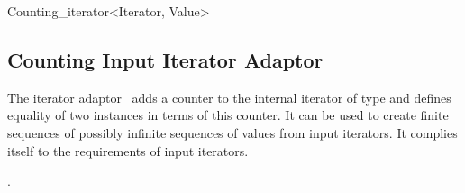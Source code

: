 \begin{ccClassTemplate}{Counting_iterator<Iterator, Value>}
\subsection{Counting Input Iterator Adaptor}
\label{sectionCountingIterator}

\ccDefinition

The iterator adaptor \ccClassTemplateName\ adds a counter to the
internal iterator of type  and defines equality of two
instances in terms of this counter. It can be used to create finite
sequences of possibly infinite sequences of values from input
iterators. It complies itself to the requirements of input iterators.


\ccCreation




\ccSeeAlso

.
\end{ccClassTemplate}




